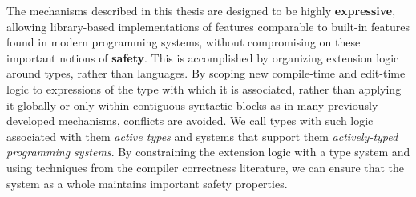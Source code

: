The mechanisms described in this thesis are designed to be highly \textbf{expressive}, allowing library-based implementations of features comparable to built-in features found in modern programming systems, without compromising on these important notions of \textbf{safety}. This is accomplished by organizing extension logic around types, rather than languages. By scoping new compile-time and edit-time logic to expressions of the type with which it is associated, rather than applying it globally or only within contiguous syntactic blocks as in many previously-developed mechanisms, conflicts are avoided.  We call types with such logic associated with them \emph{active types} and systems that support them \emph{actively-typed programming systems}. By constraining the extension logic with a type system and using techniques from the compiler correctness literature, we can ensure that the system as a whole maintains important safety properties. %



